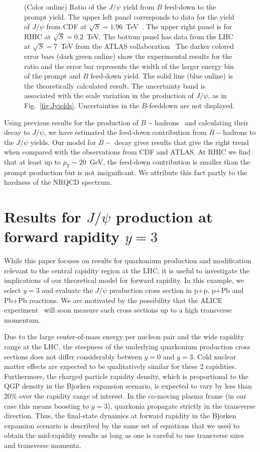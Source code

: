 \documentclass[article,showpacs,preprintnumbers,amsmath,amssymb]{revtex4}
\begin{document}
\begin{appendix}
\begin{figure}[!ht]
\caption{(Color online) Ratio of the $J/\psi$ yield from $B$ feed-down to the
prompt yield.  The upper left panel corresponds to data for the yield of
$J/\psi$ from CDF at $\sqrt{S}=1.96$~TeV~\cite{Acosta:2004yw}. The upper right
panel is for RHIC at $\sqrt{S}=0.2$~TeV.  The bottom panel has data from the
LHC at $\sqrt{S}=7$~TeV from the ATLAS collaboration~\cite{Aad:2011sp} The
darker colored error bars (dark green online) show the experimental results for
the ratio and the error bar represents the width of the larger energy bin of
the prompt and $B$ feed-down yield. The solid line (blue online) is the
theoretically calculated result. The uncertainty band is associated with the
scale variation in the production of $J/\psi$, as in Fig.~\ref{fig:Jyields}.
Uncertainties in the $B$-feeddown are not displayed. \label{fig:Jyieldsratio}}
\end{figure} 

Using previous results for the production of $B-$hadrons~\cite{hep-ph/0611109}
and calculating their decay to $J/\psi$, we have estimated the feed-down
contribution from $B-$hadrons to the $J/\psi$ yields. Our model for $B-$ decay
gives results that give the right trend when compared with the observations
from CDF and ATLAS. At RHIC we find that at least up to $p_T\sim20$~GeV, the
feed-down contribution is smaller than the prompt production but is not
insignificant. We attribute this fact partly to the hardness of the NRQCD
spectrum.


\section{Results for $J/\psi$ production  at forward rapidity $y=3$
~\label{appendix:y3}}

While this paper focuses on results for quarkonium production and modification  
relevant to the central rapidity region at the LHC, it is useful to investigate the 
implications of our theoretical model for forward rapidity.  In this example, we select 
$y=3$ and evaluate the  $J/\psi$ production cross section in p+p, p+Pb and Pb+Pb reactions.
We are motivated by the possibility that the ALICE experiment~\cite{Abelev:2012rv} will 
soon measure such cross sections up to a high transverse momentum. 

Due to the large center-of-mass energy per nucleon pair and the wide rapidity range at the
LHC, the steepness of the underlying quarkonium production cross sections does  
not differ considerably between $y=0$ and $y=3$. Cold nuclear matter effects are expected 
to be qualitatively similar for these 2 rapidities. Furthermore, the charged particle
rapidity density, which is proportional to the QGP density in the Bjorken expansion
scenario, is expected to vary by less than 20\% over the rapidity range of interest.
In the co-moving plasma frame (in our case this means boosting to $y=3$), quarkonia 
propagate strictly in the transverse direction. Thus, the final-state dynamics at forward 
rapidity in the Bjorken expansion scenario is described by the same set of equations 
that we used to obtain the mid-rapidity results as long as one is careful to use
transverse sizes and transverse momenta.
 

\end{appendix}
\end{document}
